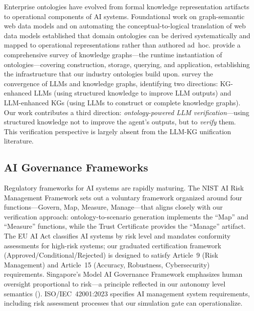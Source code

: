 \documentclass[11pt,a4paper]{article}
\begin{document}
Enterprise ontologies have evolved from formal knowledge
representation artifacts to operational components of AI systems.
Foundational work on graph-semantic web data models
\citep{sanyal2011graph} and on automating the conceptual-to-logical
translation of web data models \citep{sanyal2010automating}
established that domain ontologies can be derived systematically and
mapped to operational representations rather than authored ad~hoc.
\citet{hogan2021knowledge} provide a comprehensive survey of
knowledge graphs---the runtime instantiation of ontologies---covering
construction, storage, querying, and application, establishing the
infrastructure that our industry ontologies build upon.
\citet{pan2024unifying} survey the convergence of LLMs and knowledge
graphs, identifying two directions: KG-enhanced LLMs (using
structured knowledge to improve LLM outputs) and LLM-enhanced KGs
(using LLMs to construct or complete knowledge graphs). Our work
contributes a third direction: \emph{ontology-powered LLM
verification}---using structured knowledge not to improve the
agent's outputs, but to \emph{verify} them. This verification
perspective is largely absent from the LLM-KG unification literature.

\subsection{AI Governance Frameworks}

Regulatory frameworks for AI systems are rapidly maturing.
The NIST AI Risk Management Framework \citep{nist2023ai} sets out a
voluntary framework organized around four functions---Govern, Map,
Measure, Manage---that aligns closely with our verification approach:
ontology-to-scenario generation implements the ``Map'' and ``Measure''
functions, while the Trust Certificate provides the ``Manage''
artifact. The EU AI Act \citep{euaiact2024} classifies AI systems by
risk level and mandates conformity assessments for high-risk systems;
our graduated certification framework (Approved/Conditional/Rejected)
is designed to satisfy Article~9 (Risk Management) and Article~15
(Accuracy, Robustness, Cybersecurity) requirements. Singapore's
Model AI Governance Framework \citep{imda2020model} emphasizes
human oversight proportional to risk---a principle reflected in our
autonomy level semantics ().
ISO/IEC~42001:2023 \citep{iso42001} specifies AI management system
requirements, including risk assessment processes that our simulation
gate can operationalize.
\end{document}
